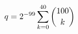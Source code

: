 \documentclass[preview]{standalone}
\begin{document}
\begin{align*}
\special{dvisvgm:raw <g id='unique000'>}q=2^{-99}\sum_{k=0}^{40}\binom{100}{k}\special{dvisvgm:raw </g>}
\end{align*}
\end{document}
